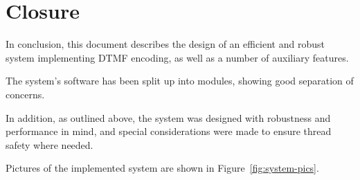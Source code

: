 \documentclass[11pt,a4paper,twocolumn]{scrartcl}
\begin{document}
\section{Closure}

In conclusion, this document describes the design of an efficient and robust system implementing DTMF encoding, as well as a number of auxiliary features. 

The system's software has been split up into modules, showing good separation of concerns. 

In addition, as outlined above, the system was designed with robustness and performance in mind, and special considerations were made to ensure thread safety where needed.

Pictures of the implemented system are shown in Figure~\ref{fig:system-pics}.
\end{document}
